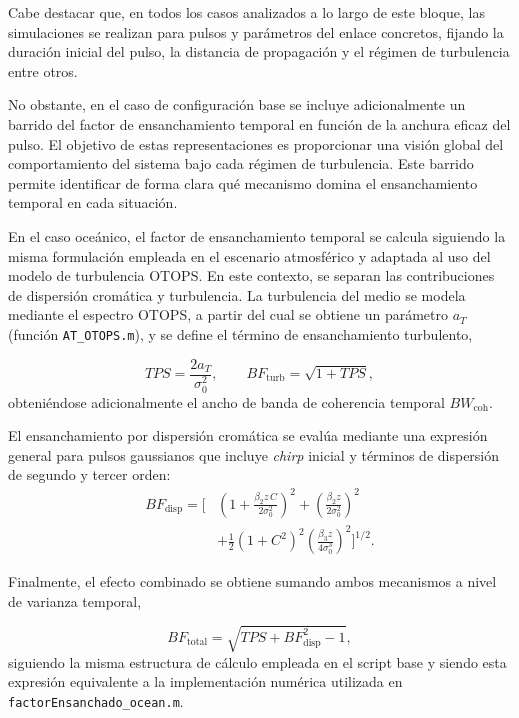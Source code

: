 Cabe destacar que, en todos los casos analizados a lo largo de este bloque, las simulaciones se realizan para pulsos y parámetros del enlace concretos, fijando la duración inicial del pulso, la distancia de propagación y el régimen de turbulencia entre otros.

No obstante, en el caso de configuración base se incluye adicionalmente un barrido del factor de ensanchamiento temporal en función de la anchura eficaz del pulso. El objetivo de estas representaciones es proporcionar una visión global del comportamiento del sistema bajo cada régimen de turbulencia. Este barrido permite identificar de forma clara qué mecanismo domina el ensanchamiento temporal en cada situación. 

En el caso oceánico, el factor de ensanchamiento temporal se calcula siguiendo la misma formulación empleada en el escenario atmosférico y adaptada al uso del modelo de turbulencia OTOPS. En este contexto, se separan las contribuciones de dispersión cromática y turbulencia. La turbulencia del medio se modela mediante el espectro OTOPS, a partir del cual se obtiene un parámetro $a_T$ (función \texttt{AT\_OTOPS.m}), y se define el término de ensanchamiento turbulento, 


\begin{equation}
TPS = \frac{2a_T}{\sigma_0^2}, \qquad
BF_{\mathrm{turb}} = \sqrt{1 + TPS},
\end{equation}
obteniéndose adicionalmente el ancho de banda de coherencia temporal
$BW_{\mathrm{coh}}$.


El ensanchamiento por dispersión cromática se evalúa mediante una expresión general para pulsos gaussianos que incluye \textit{chirp} inicial y términos de dispersión de segundo y tercer orden:
\begin{equation}
\begin{aligned}
BF_{\mathrm{disp}} = \Bigg[
&\left(1 + \frac{\beta_2 z\, C}{2\sigma_0^2}\right)^2
+ \left(\frac{\beta_2 z}{2\sigma_0^2}\right)^2 \\
&+ \frac{1}{2}(1 + C^2)^2
\left(\frac{\beta_3 z}{4\sigma_0^3}\right)^2
\Bigg]^{1/2}.
\end{aligned}
\end{equation}

Finalmente, el efecto combinado se obtiene sumando ambos mecanismos a nivel de varianza temporal,

\begin{equation}
BF_{\mathrm{total}} =
\sqrt{ TPS + BF_{\mathrm{disp}}^2 - 1 },
\end{equation}
siguiendo la misma estructura de cálculo empleada en el script base y siendo esta expresión equivalente a la implementación numérica utilizada en \texttt{factorEnsanchado\_ocean.m}.


